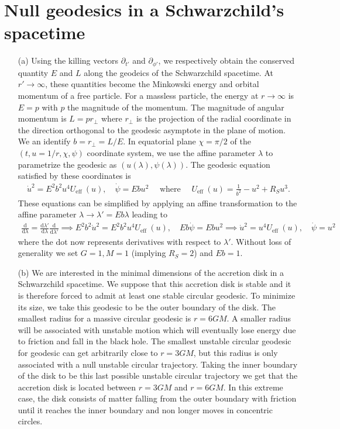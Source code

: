 \documentclass[10pt, a4paper]{article}
\begin{document}
\section{Null geodesics in a Schwarzchild's spacetime}
\begin{enumerate}
  \item[(a)] Using the killing vectors $\partial_{t'}$ and $\partial_{\phi'}$, we respectively obtain the conserved quantity $E$ and $L$ along the geodeics of the Schwarzchild spacetime. At $r' \to \infty$, these quantities become the Minkowski energy and orbital momentum of a free particle. For a massless particle, the energy at $r\to \infty$ is $E = p$ with $p$ the magnitude of the momentum. The magnitude of angular momentum is $L = p r_\perp$ where $r_\perp$ is the projection of the radial coordinate in the direction orthogonal to the geodesic asymptote in the plane of motion. We an identify  $b = r_\perp = L/E$. In equatorial plane $\chi = \pi/2$ of the $(t, u = 1/r, \chi, \psi)$ coordinate system, we use the affine parameter $\lambda$ to parametrize the geodesic as $(u(\lambda), \psi(\lambda))$. The geodesic equation satisfied by these coordinates is 
  \begin{align*}
    \dot{u}^2=E^2 b^2 u^4 U_{\text {eff }}(u), \quad \dot{\psi}=E b u^2 \quad \text{ where }\quad U_{\text {eff }}(u)=\frac{1}{b^2}-u^2+R_S u^3.
  \end{align*}
  These equations can be simplified by applying an affine transformation to the affine parameter $\lambda \to \lambda' = Eb \lambda$ leading to 
  \begin{align*}
    \frac{\text{d}}{\text{d}\lambda}  =  \frac{\text{d}\lambda'}{\text{d}\lambda} \frac{\text{d}}{\text{d}\lambda'} \implies  E^2 b^2\dot{u}^2= E^2 b^2 u^4 U_{\text {eff }}(u), \quad Eb\dot{\psi}= Eb u^2\implies \dot{u}^2= u^4 U_{\text {eff }}(u), \quad \dot{\psi}= u^2
  \end{align*}
  where the dot now represents derivatives with respect to $\lambda'$. Without loss of generality we set $G = 1, M = 1$ (implying $R_S=2$) and $Eb = 1$. 
  \item[(b)] We are interested in the minimal dimensions of the accretion disk in a Schwarzchild spacetime. We suppose that this accretion disk is stable and it is therefore forced to admit at least one stable circular geodesic. To minimize its size, we take this geodesic to be the outer boundary of the disk. The smallest radius for a massive circular geodesic is $r=6GM$. A smaller radius will be associated with unstable motion which will eventually lose energy due to friction and fall in the black hole. The smallest unstable circular geodesic for geodesic can get arbitrarily close to $r=3GM$, but this radius is only associated with a null unstable circular trajectory. Taking the inner boundary of the disk to be this last possible unstable circular trajectory we get that the accretion disk is located between $r=3GM$ and $r=6GM$. In this extreme case, the disk consists of matter falling from the outer boundary with friction until it reaches the inner boundary and non longer moves in concentric circles.  

\end{enumerate}
\end{document}
